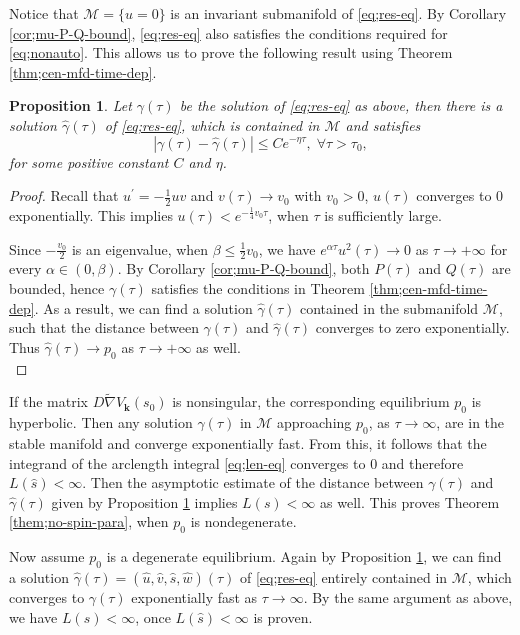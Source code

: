 \documentclass[11pt]{amsart}
\newtheorem{proposition}[theorem]{Proposition}
\theoremstyle{definition}
\theoremstyle{remark}
\numberwithin{equation}{section}
\newcommand{\al}{\alpha}
\newcommand{\gm}{\gamma}
\begin{document}
Notice that $\mathcal M = \{u=0\}$ is an invariant submanifold of \eqref{eq;res-eq}. By Corollary \ref{cor;mu-P-Q-bound}, \eqref{eq;res-eq} also satisfies the conditions required for \eqref{eq;nonauto}. This allows us to prove the following result using Theorem \ref{thm;cen-mfd-time-dep}. 
 

\begin{proposition}
\label{prop;app-sol} Let $\gm(\tau)$ be the solution of \eqref{eq;res-eq} as above, then there is a solution $\hat{\gm}(\tau)$ of \eqref{eq;res-eq}, which is contained in $\mathcal M$ and satisfies 
$$|\gm(\tau) -\hat{\gm}(\tau)| \le C e^{-\eta \tau}, \; \forall \tau >\tau_0,$$
for some positive constant $C$ and $\eta$. 
\end{proposition}

\begin{proof}
Recall that $u^\prime =-\frac{1}{2}uv$ and $v(\tau)\rightarrow v_0$ with $v_0>0$, $u(\tau)$ converges to $0$ exponentially. This implies $u(\tau)<e^{-\frac{1}{4}v_0\tau}$, when $\tau$ is sufficiently large. 

Since $-\frac{v_0}{2}$ is an eigenvalue, when $\beta\le \frac{1}{2}v_0$, we have $e^{\al \tau}u^2(\tau)\rightarrow 0$ as $\tau\rightarrow+\infty$ for every $\al\in(0,\beta)$. By Corollary \ref{cor;mu-P-Q-bound}, both $P(\tau)$ and $Q(\tau)$ are bounded, hence $\gamma(\tau)$ satisfies the conditions in Theorem \ref{thm;cen-mfd-time-dep}. As a result, we can find a solution $\hat{\gamma}(\tau)$ contained in the submanifold $\mathcal M$, such that the distance between $\gamma(\tau)$ and $\hat{\gamma}(\tau)$ converges to zero exponentially. Thus $\hat{\gamma}(\tau)\rightarrow p_0$ as $\tau\rightarrow +\infty$ as well.\\
\end{proof}
 
If the matrix $D\tilde{\nabla}V_\mathbf{k}(s_0)$ is nonsingular, the corresponding equilibrium $p_0$ is hyperbolic. Then any solution $\hat{\gm}(\tau)$ in $\mathcal M$ approaching $p_0$, as $\tau\rightarrow \infty$, are in the stable manifold and converge exponentially fast. From this, it follows that the integrand of the arclength integral \eqref{eq;len-eq} converges to $0$ and therefore $L(\hat{s})<\infty$. Then the asymptotic estimate of the distance between $\gamma(\tau)$ and $\hat{\gamma}(\tau)$ given by Proposition \ref{prop;app-sol} implies $L(s)<\infty$ as well. This proves Theorem \ref{them;no-spin-para}, when $p_0$ is nondegenerate.

Now assume $p_0$ is a degenerate equilibrium. Again by Proposition \ref{prop;app-sol}, we can find a solution $\hat{\gm}(\tau) = (\hat u, \hat v, \hat s, \hat w)(\tau)$ of \eqref{eq;res-eq} entirely contained in $\mathcal M$, which converges to $\gm(\tau)$ exponentially fast as $\tau \to \infty$. By the same argument as above, we have $L(s) < \infty$, once $L(\hat s) <\infty$ is proven. 
\end{document}
